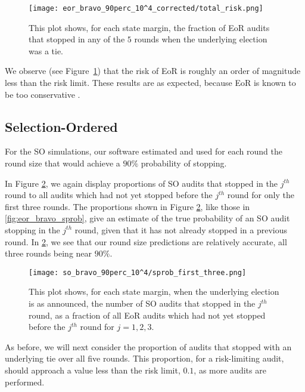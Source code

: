 \begin{figure}
\texttt{[image: eor\_bravo\_90perc\_10^4\_corrected/total\_risk.png]}
\caption{This plot shows, for each state margin,
the fraction of EoR \BRAVO audits that stopped in any of the $5$ rounds when the underlying election was a tie.}
\label{fig:eor_bravo_risk}
\end{figure}

We observe (see Figure~\ref{fig:eor_bravo_risk}) that the risk of EoR \BRAVO is roughly
an order of magnitude less than the risk limit. 
These results are as expected, because EoR \BRAVO is known to be too conservative \cite{usenix_minerva}.  

\subsection{Selection-Ordered \BRAVO}
For the SO \BRAVO simulations, our software estimated and used for each round
the round size that would achieve a $90\%$ probability of stopping.

In Figure \ref{fig:so_bravo_sprob}, we again display proportions of SO \BRAVO audits that stopped in the $j^{th}$ round
to all audits which had not yet stopped before the $j^{th}$ round for only the first three rounds.
The proportions shown in Figure \ref{fig:so_bravo_sprob}, like those in \ref{fig:eor_bravo_sprob}, give an estimate
of the true probability of an SO \BRAVO audit stopping in the $j^{th}$ round,
given that it has not already stopped in a previous round. 
In \ref{fig:so_bravo_sprob}, we see that our round size predictions are relatively accurate,
all three rounds being near $90\%$.

\begin{figure}
\texttt{[image: so\_bravo\_90perc\_10^4/sprob\_first\_three.png]}\caption{
This plot shows, for each state margin, when the underlying election is as announced, the number of SO \BRAVO audits that stopped in the $j^{th}$ round,
as a fraction of all EoR \BRAVO audits which had not yet stopped before the $j^{th}$ round for $j=1,2,3$.}
\label{fig:so_bravo_sprob}
\end{figure}

As before, we will next consider the proportion of audits that stopped with an underlying tie over all five rounds.
This proportion, for a risk-limiting audit, should approach a value less than the risk limit, 
$0.1$, as more audits are performed.

